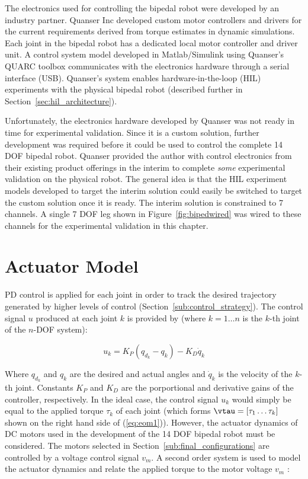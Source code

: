 The electronics used for controlling the bipedal robot were developed by an industry partner. Quanser Inc developed custom motor controllers and drivers for the current requirements derived from torque estimates in dynamic simulations. Each joint in the bipedal robot has a dedicated local motor controller and driver unit. A control system model developed in Matlab/Simulink using Quanser's QUARC toolbox communicates with the electronics hardware through a serial interface (USB). Quanser's system enables hardware-in-the-loop (HIL) experiments with the physical bipedal robot (described further in Section~\ref{sec:hil_architecture}).    

Unfortunately, the electronics hardware developed by Quanser was not ready in time for experimental validation. Since it is a custom solution, further development was required before it could be used to control the complete 14 DOF bipedal robot. Quanser provided the author with control electronics from their existing product offerings in the interim to complete \emph{some} experimental validation on the physical robot. The general idea is that the HIL experiment models developed to target the interim solution could easily be switched to target the custom solution once it is ready. The interim solution is constrained to 7 channels. A single 7 DOF leg shown in Figure~\ref{fig:bipedwired} was wired to these channels for the experimental validation in this chapter. 



\section{Actuator Model} %
\label{sec:actuator_model}
PD control is applied for each joint in order to track the desired trajectory generated by higher levels of control (Section~\ref{sub:control_strategy}). The control signal $u$ produced at each joint $k$ is provided by (where $k = 1 \ldots n$ is the $k$-th joint of the $n$-DOF system): 

\begin{equation}
	{u_k} = {K_P}({q_{d_k}} - {q_k}) - {K_D}{\dot q_k}
	\label{eq:pdcontrollaw}
\end{equation} 

Where ${q_{d_k}}$ and ${q_k}$ are the desired and actual angles and ${\dot q_k}$ is the velocity of the $k$-th joint. Constants ${K_P}$ and ${K_D}$ are the porportional and derivative gains of the controller, respectively. In the ideal case, the control signal ${u_k}$ would simply be equal to the applied torque ${\tau _k}$ of each joint (which forms $\vtau = \left[\tau _1 \ldots \tau _k \right]$ shown on the right hand side of (\ref{eq:eom1})). However, the actuator dynamics of DC motors used in the development of the 14 DOF bipedal robot must be considered. The motors selected in Section~\ref{sub:final_configurations} are controlled by a voltage control signal $v_{m}$. A second order system is used to model the actuator dynamics and relate the applied torque to the motor voltage $v _m$ \cite{Spong2008}: 

